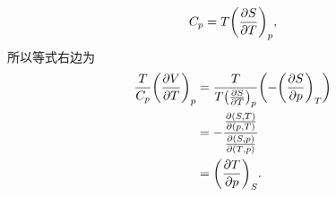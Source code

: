 \begin{questions}
\begin{solution}
\begin{equation}
    \end{equation}
    \begin{equation}
      C_p = T\qty(\pdv{S}{T})_p,
    \end{equation}
    所以等式右边为
    \begin{equation}
      \begin{aligned}
        \frac{T}{C_p} \qty(\pdv{V}{T})_p & = \frac{T}{T\qty(\pdv{S}{T})_p}\qty(-\qty(\pdv{S}{p})_T) \\
                                         & = -\frac{\pdv{(S,T)}{(p,T)}}{\pdv{(S,p)}{(T,p)}}         \\
                                         & = \qty(\pdv{T}{p})_S.
      \end{aligned}
    \end{equation}
  \end{solution}
\end{questions}